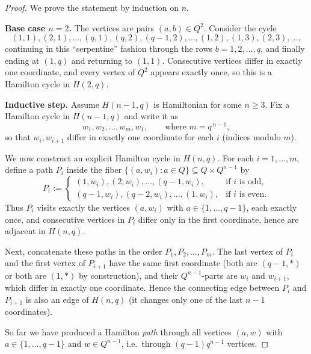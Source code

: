 \documentclass[11pt, a4paper]{ctexrep}
\begin{document}
\begin{proof}
    We prove the statement by induction on $n$.

    \medskip
    \noindent\textbf{Base case $n=2$.}
    The vertices are pairs $(a,b)\in Q^2$. Consider the cycle
    \[
        (1,1),(2,1),\dots,(q,1),(q,2),(q-1,2),\dots,(1,2),(1,3),(2,3),\dots,
    \]
    continuing in this ``serpentine'' fashion through the rows $b=1,2,\dots,q$,
    and finally ending at $(1,q)$ and returning to $(1,1)$.
    Consecutive vertices differ in exactly one coordinate, and every vertex of $Q^2$
    appears exactly once, so this is a Hamilton cycle in $H(2,q)$.

    \medskip
    \noindent\textbf{Inductive step.}
    Assume $H(n-1,q)$ is Hamiltonian for some $n\ge 3$.
    Fix a Hamilton cycle in $H(n-1,q)$ and write it as
    \[
        w_1,w_2,\dots,w_m,w_1,
        \qquad \text{where } m=q^{\,n-1},
    \]
    so that $w_i,w_{i+1}$ differ in exactly one coordinate for each $i$
    (indices modulo $m$).

    We now construct an explicit Hamilton cycle in $H(n,q)$.
    For each $i=1,\dots,m$, define a path $P_i$ inside the fiber
    $\{(a,w_i):a\in Q\}\subseteq Q\times Q^{n-1}$ by
    \[
        P_i :=
        \begin{cases}
            (1,w_i),(2,w_i),\dots,(q-1,w_i),   & \text{if $i$ is odd},  \\[2mm]
            (q-1,w_i),(q-2,w_i),\dots,(1,w_i), & \text{if $i$ is even}.
        \end{cases}
    \]
    Thus $P_i$ visits exactly the vertices $(a,w_i)$ with $a\in\{1,\dots,q-1\}$,
    each exactly once, and consecutive vertices in $P_i$ differ only in the first
    coordinate, hence are adjacent in $H(n,q)$.

    Next, concatenate these paths in the order $P_1,P_2,\dots,P_m$.
    The last vertex of $P_i$ and the first vertex of $P_{i+1}$ have the same
    first coordinate (both are $(q-1,\ast)$ or both are $(1,\ast)$ by construction),
    and their $Q^{n-1}$-parts are $w_i$ and $w_{i+1}$, which differ in exactly one
    coordinate. Hence the connecting edge between $P_i$ and $P_{i+1}$ is also an
    edge of $H(n,q)$ (it changes only one of the last $n-1$ coordinates).

    So far we have produced a Hamilton \emph{path} through all vertices
    $(a,w)$ with $a\in\{1,\dots,q-1\}$ and $w\in Q^{n-1}$, i.e.\ through
    $(q-1)q^{n-1}$ vertices.


\end{proof}
\end{document}
